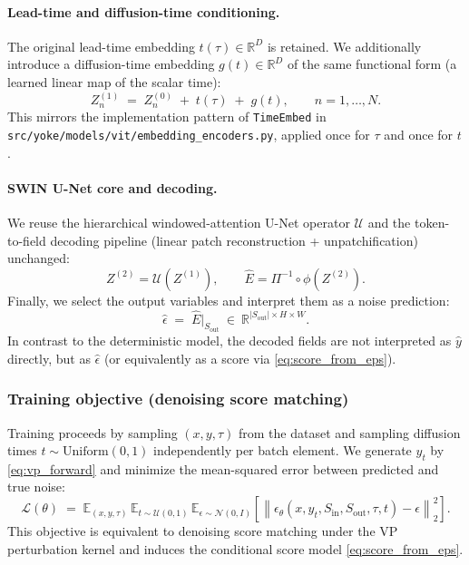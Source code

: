 \documentclass{article} %
\begin{document}
\paragraph{Lead-time and diffusion-time conditioning.}
The original lead-time embedding $t(\tau)\in\mathbb{R}^D$ is retained. We additionally introduce a diffusion-time
embedding $g(t)\in\mathbb{R}^D$ of the same functional form (a learned linear map of the scalar time):
\begin{equation}
Z^{(1)}_n \;=\; Z^{(0)}_n \;+\; t(\tau) \;+\; g(t),\qquad n=1,\dots,N.
\label{eq:time_conditioning}
\end{equation}
This mirrors the implementation pattern of \texttt{TimeEmbed} in \texttt{src/yoke/models/vit/embedding\_encoders.py},
applied once for $\tau$ and once for $t$.

\paragraph{SWIN U-Net core and decoding.}
We reuse the hierarchical windowed-attention U-Net operator $\mathcal{U}$ and the token-to-field decoding
pipeline (linear patch reconstruction + unpatchification) unchanged:
\[
Z^{(2)} = \mathcal{U}(Z^{(1)}),\qquad
\widehat{E} = \Pi^{-1}\circ \phi(Z^{(2)}).
\]
Finally, we select the output variables and interpret them as a noise prediction:
\begin{equation}
\widehat{\epsilon} \;=\; \widehat{E}\big|_{S_{\mathrm{out}}}\ \in\ \mathbb{R}^{|S_{\mathrm{out}}|\times H\times W}.
\label{eq:eps_select}
\end{equation}
In contrast to the deterministic model, the decoded fields are not interpreted as $\hat{y}$ directly, but as
$\widehat{\epsilon}$ (or equivalently as a score via \eqref{eq:score_from_eps}).

\subsubsection{Training objective (denoising score matching)}
\label{subsec:training_objective}

Training proceeds by sampling $(x,y,\tau)$ from the dataset and sampling diffusion times $t\sim\mathrm{Uniform}(0,1)$
independently per batch element. We generate $y_t$ by \eqref{eq:vp_forward} and minimize the mean-squared error
between predicted and true noise:
\begin{equation}
\mathcal{L}(\theta)
\;=\;
\mathbb{E}_{(x,y,\tau)}\,
\mathbb{E}_{t\sim \mathcal{U}(0,1)}\,
\mathbb{E}_{\epsilon\sim\mathcal{N}(0,I)}
\left[
\left\|
\epsilon_\theta(x,y_t,S_{\mathrm{in}},S_{\mathrm{out}},\tau,t)
-
\epsilon
\right\|_2^2
\right].
\label{eq:diffusion_loss}
\end{equation}
This objective is equivalent to denoising score matching under the VP perturbation kernel and induces the
conditional score model \eqref{eq:score_from_eps}.
\end{document}
